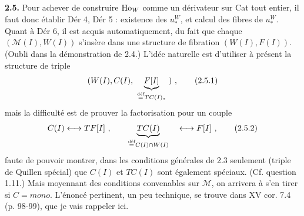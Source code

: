 \textbf{2.5.} Pour achever de construire $\mathrm{Ho}_W$ comme un dérivateur sur Cat tout entier, il faut  donc établir Dér 4, Dér 5 : existence des $u_*^W$, et calcul des fibres de $u_*^W$. Quant à Dér 6, il est acquis automatiquement, du fait que chaque $(\mathcal{M}(I),W(I))$ s'insère dans une structure de fibration $(W(I),F(I))$. (Oubli dans la démonstration de 2.4.) L'idée naturelle est d'utiliser à présent la structure de triple
\[ (W(I),C(I),\ \underbrace{F[I]}_{\deq TC(I)_*}\ )\ , \tag*{(2.5.1)} \]
mais la difficulté est de prouver la factorisation pour un couple
\[ C(I) \longleftrightarrow TF[I]\ , \qquad \underbrace{TC(I)}_{\deq C(I)\cap W(I)} \quad \longleftrightarrow F[I]\ , \tag*{(2.5.2)} \]
faute de pouvoir montrer, dans les conditions générales de 2.3 seulement (triple de Quillen spécial) que $C(I)$ et $TC(I)$ sont également spéciaux. (Cf. question 1.11.) Mais moyennant des conditions convenables sur $\mathcal{M}$, on arrivera à s'en tirer si $C = \mathit{mono}$. L'énoncé pertinent, un peu technique, se trouve dans XV cor. 7.4 (p. 98-99), que je vais rappeler ici.

